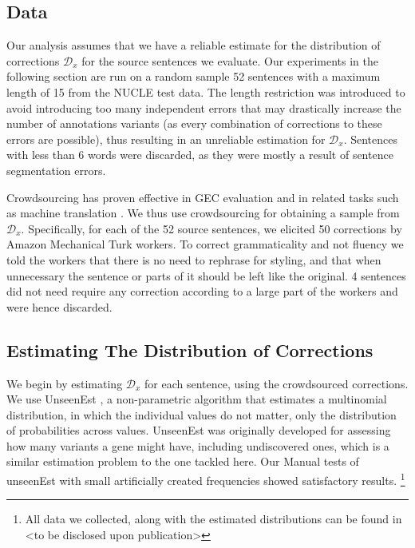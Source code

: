 \documentclass[letter,11pt]{article}
\begin{document}
\subsection{Data}

Our analysis assumes that we have a reliable estimate for the distribution of corrections
$\mathcal{D}_x$ for the source sentences we evaluate.
Our experiments in the following section are run on a random sample 52 sentences with a
maximum length of 15 from the NUCLE test data. 
The length restriction was introduced to avoid introducing too many independent
errors that may drastically increase the number of annotations variants
(as every combination of corrections to these errors are possible),
thus resulting in an unreliable estimation for $\mathcal{D}_x$.
Sentences with less than 6 words 
were discarded, as they were mostly a result of sentence segmentation errors.

Crowdsourcing has proven effective in 
GEC evaluation \cite{madnani2011they,napoles2015ground} and in related
tasks such as machine translation 
\cite{zaidan2011crowdsourcing,post2012constructing}.
We thus use crowdsourcing for obtaining a sample from $\mathcal{D}_x$. Specifically,
for each of the 52 source sentences, we elicited 50 corrections by Amazon Mechanical
Turk workers. To correct grammaticality and not fluency we told the workers that there is no need to rephrase for styling, and that when unnecessary the sentence or parts of it should be left like the original.
4 sentences did not need require any correction according to a large part of the workers and were hence discarded.

\subsection{Estimating The Distribution of Corrections}

We begin by estimating $\mathcal{D}_x$ for each sentence, using the crowdsourced
corrections.
We use {\sc UnseenEst} \cite{zou2015quantifying}, a non-parametric algorithm that
estimates a multinomial distribution,
in which the individual values do not matter, only the distribution of probabilities
across values.%
{\sc UnseenEst} was originally developed for assessing how many
variants a gene might have, including undiscovered ones, which is a similar
estimation problem to the one tackled here.
Our Manual tests of unseenEst with small artificially created frequencies showed satisfactory results.
\footnote{All data we collected, along with the estimated
  distributions can be found in <to be disclosed upon publication>}
\end{document}
